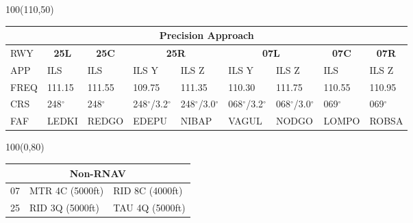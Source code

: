\documentclass[10pt,landscape,a4paper]{article}
\begin{document}
\begin{textblock}{100}(110,50)
\begin{table}[]
\begin{tabular}{|l|l|l|l|l|l|l|l|l|}
\multicolumn{9}{c}{\textbf{Precision Approach}}                                                                                                                                                                            \\ \hline
RWY  & \multicolumn{1}{c|}{\textbf{25L}} & \multicolumn{1}{c|}{\textbf{25C}} & \multicolumn{2}{c|}{\textbf{25R}} & \multicolumn{2}{c|}{\textbf{07L}} & \multicolumn{1}{c|}{\textbf{07C}} & \multicolumn{1}{c|}{\textbf{07R}} \\ \hline
APP  & ILS                               & ILS                               & ILS Y           & ILS Z           & ILS Y           & ILS Z           & ILS                               & ILS Z                             \\
FREQ & 111.15                            & 111.55                            & 109.75          & 111.35          & 110.30          & 111.75          & 110.55                            & 110.95                            \\
CRS  & 248$^\circ$                              & 248$^\circ$                              & 248$^\circ$/3.2$^\circ$       & 248$^\circ$/3.0$^\circ$       & 068$^\circ$/3.2$^\circ$       & 068$^\circ$/3.0$^\circ$       & 069$^\circ$                              & 069$^\circ$                              \\
FAF  & LEDKI                             & REDGO                             & EDEPU           & NIBAP           & VAGUL           & NODGO           & LOMPO                             & ROBSA                             \\ \hline
\end{tabular}
\end{table}
\end{textblock}



\begin{textblock}{100}(0,80)
\begin{table}[]
\begin{tabular}{|l|l|l|}
\multicolumn{3}{c}{\textbf{Non-RNAV}} \\ \hline
07  & MTR 4C (5000ft)    & RID 8C (4000ft)   \\ \hline
25  & RID 3Q (5000ft)    & TAU 4Q (5000ft)   \\ \hline
\end{tabular}
\end{table}
\end{textblock}
\end{document}
